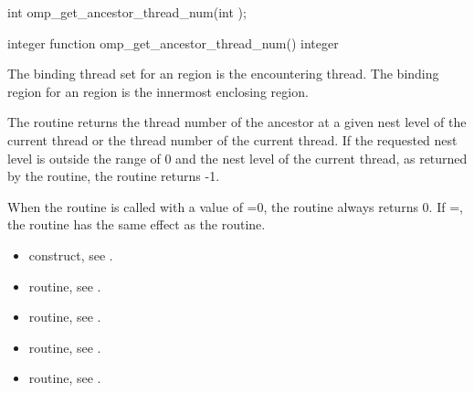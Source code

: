 \begin{samepage}
\format
\begin{ccppspecific}
\begin{ompcFunction}
int omp_get_ancestor_thread_num(int );
\end{ompcFunction}
\end{ccppspecific}
\end{samepage}

\begin{fortranspecific}
\begin{ompfFunction}
integer function omp_get_ancestor_thread_num()
integer 
\end{ompfFunction}
\end{fortranspecific}

\binding
The binding thread set for an  region is the
encountering thread. The binding region for an 
region is the innermost enclosing  region.

\effect
The  routine returns the thread number 
of the ancestor at a given nest level of the current thread or the thread 
number of the current thread. If the requested nest level is outside the 
range of 0 and the nest level of the current thread, as returned by the 
 routine, the routine returns -1.

\begin{note}
When the  routine is called with a value
of =0, the routine always returns 0. If 
=, the routine has the same effect as 
the  routine.
\end{note}

\crossreferences
\begin{itemize}
\item {} construct, see
.

\item {} routine, see
.

\item {} routine, see
.

\item {} routine, see
.

\item {} routine, see
.
\end{itemize}



